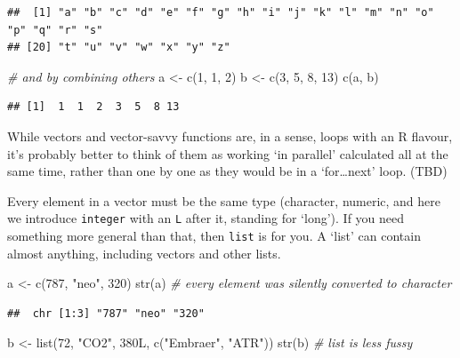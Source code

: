 \documentclass[
]{book}
\newenvironment{Shaded}{\begin{snugshade}}{\end{snugshade}}
\newcommand{\CommentTok}[1]{\textcolor[rgb]{0.56,0.35,0.01}{\textit{#1}}}
\newcommand{\DecValTok}[1]{\textcolor[rgb]{0.00,0.00,0.81}{#1}}
\newcommand{\FunctionTok}[1]{\textcolor[rgb]{0.00,0.00,0.00}{#1}}
\newcommand{\NormalTok}[1]{#1}
\newcommand{\OtherTok}[1]{\textcolor[rgb]{0.56,0.35,0.01}{#1}}
\newcommand{\StringTok}[1]{\textcolor[rgb]{0.31,0.60,0.02}{#1}}
\begin{document}
\begin{verbatim}
##  [1] "a" "b" "c" "d" "e" "f" "g" "h" "i" "j" "k" "l" "m" "n" "o" "p" "q" "r" "s"
## [20] "t" "u" "v" "w" "x" "y" "z"
\end{verbatim}

\begin{Shaded}
\begin{Highlighting}[]
\CommentTok{\# and by combining others}
\NormalTok{a }\OtherTok{\textless{}{-}} \FunctionTok{c}\NormalTok{(}\DecValTok{1}\NormalTok{, }\DecValTok{1}\NormalTok{, }\DecValTok{2}\NormalTok{)}
\NormalTok{b }\OtherTok{\textless{}{-}} \FunctionTok{c}\NormalTok{(}\DecValTok{3}\NormalTok{, }\DecValTok{5}\NormalTok{, }\DecValTok{8}\NormalTok{, }\DecValTok{13}\NormalTok{)}
\FunctionTok{c}\NormalTok{(a, b)}
\end{Highlighting}
\end{Shaded}

\begin{verbatim}
## [1]  1  1  2  3  5  8 13
\end{verbatim}

While vectors and vector-savvy functions are, in a sense, loops with an R flavour, it's probably better to think of them as working `in parallel' calculated all at the same time, rather than one by one as they would be in a `for\ldots next' loop. (TBD)

Every element in a vector must be the same type (character, numeric, and here we introduce \texttt{integer} with an \texttt{L} after it, standing for `long'). If you need something more general than that, then \texttt{list} is for you. A `list' can contain almost anything, including vectors and other lists.

\begin{Shaded}
\begin{Highlighting}[]
\NormalTok{a }\OtherTok{\textless{}{-}} \FunctionTok{c}\NormalTok{(}\DecValTok{787}\NormalTok{, }\StringTok{"neo"}\NormalTok{, }\DecValTok{320}\NormalTok{)}
\FunctionTok{str}\NormalTok{(a) }\CommentTok{\# every element was silently converted to character}
\end{Highlighting}
\end{Shaded}

\begin{verbatim}
##  chr [1:3] "787" "neo" "320"
\end{verbatim}

\begin{Shaded}
\begin{Highlighting}[]
\NormalTok{b }\OtherTok{\textless{}{-}} \FunctionTok{list}\NormalTok{(}\DecValTok{72}\NormalTok{, }\StringTok{"CO2"}\NormalTok{, 380L, }\FunctionTok{c}\NormalTok{(}\StringTok{"Embraer"}\NormalTok{, }\StringTok{"ATR"}\NormalTok{))}
\FunctionTok{str}\NormalTok{(b) }\CommentTok{\# list is less fussy}
\end{Highlighting}
\end{Shaded}
\end{document}
